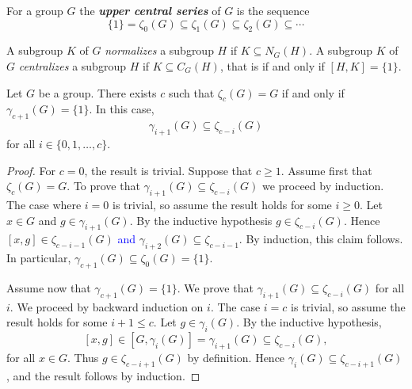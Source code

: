 For a group $G$ the \textbf{\em upper central series} of $G$ is the sequence 
\[
	\{1\}=\zeta_0(G)\subseteq\zeta_1(G)\subseteq\zeta_2(G)\subseteq\cdots
\]


A subgroup $K$ of $G$ {\em normalizes} a subgroup 
$H$ if $K\subseteq N_G(H)$.
A subgroup $K$ of $G$ {\em centralizes} a subgroup 
$H$ if $K\subseteq C_G(H)$, that is if and only if $[H,K]=\{1\}$.

\begin{lemma}
	\label{lem:gamma_zeta}
	Let $G$ be a group. There exists $c$ such that $\zeta_c(G)=G$ if and only if 
	$\gamma_{c+1}(G)=\{1\}$. In this case,  
	\[
	\gamma_{i+1}(G)\subseteq\zeta_{c-i}(G)
	\]
	for all $i\in\{0,1,\dots,c\}$. 
\end{lemma}

\begin{proof}
    For $c=0$, the result is trivial. Suppose that $c\geq 1$.
	Assume first that $\zeta_c(G)=G$. To prove that 
    $\gamma_{i+1}(G)\subseteq\zeta_{c-i}(G)$ we proceed by induction. The case where $i=0$ is
	trivial, so assume the result holds for some $i\geq0$. 
	Let $x\in G$ and $g\in \gamma_{i+1}(G)$. By the inductive hypothesis $g\in \zeta_{c-i}(G)$. 
	Hence $[x,g]\in \zeta_{c-i-1}(G)$ \textcolor{blue}{and} $\gamma_{i+2}(G)\subseteq \zeta_{c-i-1}$.
	By induction, this claim follows. In particular, $\gamma_{c+1}(G)\subseteq \zeta_{0}(G)=\{ 1\}$.
	
	Assume now that $\gamma_{c+1}(G)=\{1\}$. We prove that 
	$\gamma_{i+1}(G)\subseteq\zeta_{c-i}(G)$ for all $i$. We proceed by backward induction on $i$. 
	The case $i=c$ is trivial, so assume the
	result holds for some $i+1\leq c$. Let $g\in\gamma_{i}(G)$. By the inductive hypothesis, 
	\[
	[x,g]\in [G,\gamma_i(G)]=\gamma_{i+1}(G)\subseteq\zeta_{c-i}(G),
	\]
	for all $x\in G$.
	Thus $g\in\zeta_{c-i+1}(G)$ by definition. Hence $\gamma_{i}(G)\subseteq\zeta_{c-i+1}(G)$, and the result follows
	by induction. 
\end{proof}

